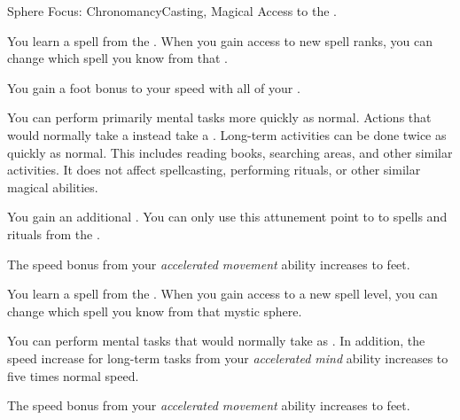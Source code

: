     \begin{feat}{Sphere Focus: Chronomancy}{Casting, Magical}
        \featpre Access to the  .

         You learn a spell from the  .
        When you gain access to new spell ranks, you can change which spell you know from that .

         You gain a  foot bonus to your speed with all of your .

         You can perform primarily mental tasks more quickly as normal.
        Actions that would normally take a  instead take a .
        Long-term activities can be done twice as quickly as normal.
        This includes reading books, searching areas, and other similar activities.
        It does not affect spellcasting, performing rituals, or other similar magical abilities.

         You gain an additional .
        You can only use this attunement point to  to spells and rituals from the  .

         The speed bonus from your \textit{accelerated movement} ability increases to  feet.

         You learn a spell from the  .
        When you gain access to a new spell level, you can change which spell you know from that mystic sphere.

         You can perform  mental tasks that would normally take  as .
        In addition, the speed increase for long-term tasks from your \textit{accelerated mind} ability increases to five times normal speed.

         The speed bonus from your \textit{accelerated movement} ability increases to  feet.
    \end{feat}

